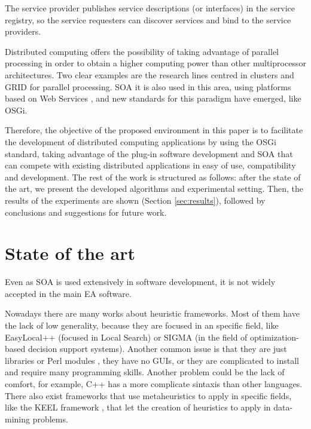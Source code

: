 \documentclass{sig-alternate}
\begin{document}
The service provider publishes service descriptions (or interfaces) in the service registry, so the service requesters can discover services and bind to the service providers.



Distributed computing offers the possibility of taking advantage of parallel processing
 in order to obtain a higher 
computing power than other multiprocessor architectures. Two clear examples are the
research lines centred in clusters \cite{Buyya} and GRID \cite{GRID_ALGORITHMS}
for parallel processing. SOA it is also used in this area, using platforms based on Web Services \cite{PAPAZOGLOU}, and new standards for this paradigm have emerged, like OSGi.



Therefore, the objective of the proposed environment in this paper is to facilitate the
development of distributed computing applications by using the OSGi standard,
taking advantage
of the plug-in software development and SOA that can compete with existing
distributed applications in easy of use, compatibility and development.
The rest of the work is structured as follows: after the state of
the art, we present the developed algorithms and experimental setting. 
Then, the results of the experiments are shown (Section \ref{sec:results}), followed by conclusions and suggestions for future work.


%
\section{State of the art}
\label{sec:soa}
%
Even as SOA is used extensively in software development, it is not widely accepted in the main EA software. 

Nowadays there are many works about heuristic
frameworks. Most of them have the lack of low generality, because they
are focused in an specific field, like EasyLocal++ \cite{EASYLOCAL} (focused in Local Search) or
SIGMA \cite{SIGMA} (in the field of optimization-based decision support systems). Another common issue is that they are just libraries
 or Perl modules \cite{PERL}, they have no GUIs, or they are complicated to
install and require many programming skills. Another problem could be
the lack of comfort, for example, C++ has a more complicate sintaxis
than other languages. There also exist frameworks that use metaheuristics to apply in specific fields, like the KEEL framework \cite{KEEL}, that let the creation of heuristics to apply in data-mining problems.
\end{document}
